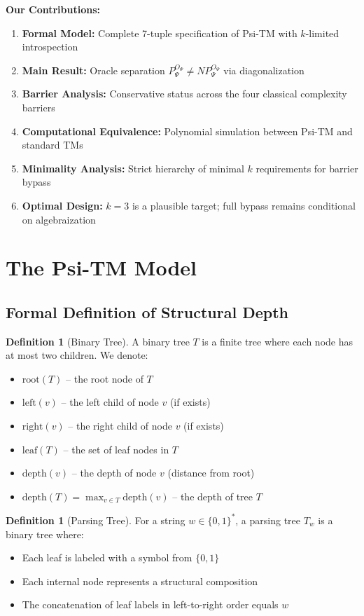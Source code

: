 \documentclass[11pt]{article}
\theoremstyle{definition}
\newtheorem{definition}[theorem]{Definition}
\begin{document}
\textbf{Our Contributions:}
\begin{enumerate}
\item \textbf{Formal Model:} Complete 7-tuple specification of Psi-TM with $k$-limited introspection
\item \textbf{Main Result:} Oracle separation $P^{O_\Psi}_\Psi \neq NP^{O_\Psi}_\Psi$ via diagonalization
\item \textbf{Barrier Analysis:} Conservative status across the four classical complexity barriers
\item \textbf{Computational Equivalence:} Polynomial simulation between Psi-TM and standard TMs
\item \textbf{Minimality Analysis:} Strict hierarchy of minimal $k$ requirements for barrier bypass
\item \textbf{Optimal Design:} $k=3$ is a plausible target; full bypass remains conditional on algebraization
\end{enumerate}

\section{The Psi-TM Model}

\subsection{Formal Definition of Structural Depth}

\begin{definition}[Binary Tree]
A binary tree $T$ is a finite tree where each node has at most two children. We denote:
\begin{itemize}
\item $\text{root}(T)$ -- the root node of $T$
\item $\text{left}(v)$ -- the left child of node $v$ (if exists)
\item $\text{right}(v)$ -- the right child of node $v$ (if exists)
\item $\text{leaf}(T)$ -- the set of leaf nodes in $T$
\item $\text{depth}(v)$ -- the depth of node $v$ (distance from root)
\item $\text{depth}(T) = \max_{v \in T} \text{depth}(v)$ -- the depth of tree $T$
\end{itemize}
\end{definition}

\begin{definition}[Parsing Tree]
For a string $w \in \{0,1\}^*$, a parsing tree $T_w$ is a binary tree where:
\begin{itemize}
\item Each leaf is labeled with a symbol from $\{0,1\}$
\item Each internal node represents a structural composition
\item The concatenation of leaf labels in left-to-right order equals $w$
\end{itemize}
\end{definition}
\end{document}
